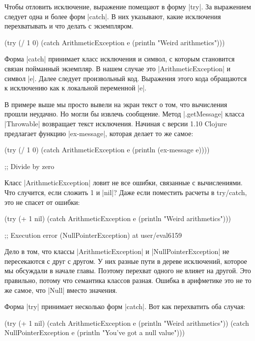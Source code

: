 Чтобы отловить исключение, выражение помещают в форму \spverb|try|. За выражением
следует одна и более форм \spverb|catch|. В них указывают, какие исключения
перехватывать и что делать с экземпляром.

\begin{code}
(try
  (/ 1 0)
  (catch ArithmeticException e
    (println "Weird arithmetics")))
\end{code}

Форма \spverb|catch| принимает класс исключения и символ, с которым становится связан
пойманный экземпляр. В нашем случае это \spverb|ArithmeticException| и символ
\spverb|e|. Далее следует произвольный код. Выражения этого кода обращаются к
исключению как к локальной переменной \spverb|e|.

В примере выше мы просто вывели на экран текст о том, что вычисления прошли
неудачно. Но могли бы извлечь сообщение. Метод \spverb|.getMessage| класса \spverb|Throwable|
возвращает текст исключения. Начиная с версии 1.10 Clojure предлагает функцию
\spverb|ex-message|, которая делает то же самое:

\begin{code}
(try
  (/ 1 0)
  (catch ArithmeticException e
    (println (ex-message e))))

;; Divide by zero
\end{code}

Класс \spverb|ArithmeticException| ловит не все ошибки, связанные с вычислениями. Что
случится, если сложить 1 и \spverb|nil|? Даже если поместить расчеты в try/catch, это
не спасет от ошибки:

\begin{code}
(try
  (+ 1 nil)
  (catch ArithmeticException e
    (println "Weird arithmetics")))

;; Execution error (NullPointerException) at user/eval6159
\end{code}

Дело в том, что классы \spverb|ArithmeticException| и \spverb|NullPointerException| не
пересекаются с друг с другом. У них разные пути в дереве исключений, которое мы
обсуждали в начале главы. Поэтому перехват одного не влияет на другой. Это
правильно, потому что семантика классов разная. Ошибка в арифметике это не то же
самое, что \spverb|Null| вместо значения.

Форма \spverb|try| принимает несколько форм \spverb|catch|. Вот как перехватить оба случая:

\begin{code}
(try
  (+ 1 nil)
  (catch ArithmeticException e
    (println "Weird arithmetics"))
  (catch NullPointerException e
    (println "You've got a null value")))
\end{code}

